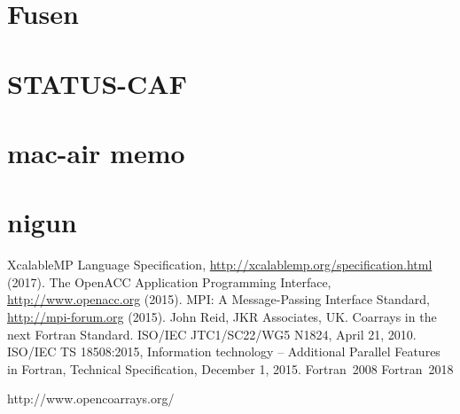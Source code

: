 \documentclass[graybox]{svmult}
\begin{document}
\section{Fusen}


\section{STATUS-CAF}


\section{mac-air memo}


\section{nigun}


                                   
\begin{thebibliography}{99}
  XcalableMP Language Specification, \url{http://xcalablemp.org/specification.html} (2017).
  The OpenACC Application Programming Interface, \url{http://www.openacc.org} (2015).
  MPI: A Message-Passing Interface Standard, \url{http://mpi-forum.org} (2015).
  John Reid, JKR Associates, UK. Coarrays in the next Fortran Standard.
    ISO/IEC JTC1/SC22/WG5 N1824, April 21, 2010.
  ISO/IEC TS 18508:2015, Information technology -- Additional Parallel 
    Features in Fortran, Technical Specification, December 1, 2015.
  Fortran~2008
  Fortran~2018

  http://www.opencoarrays.org/

\end{thebibliography}
\end{document}
